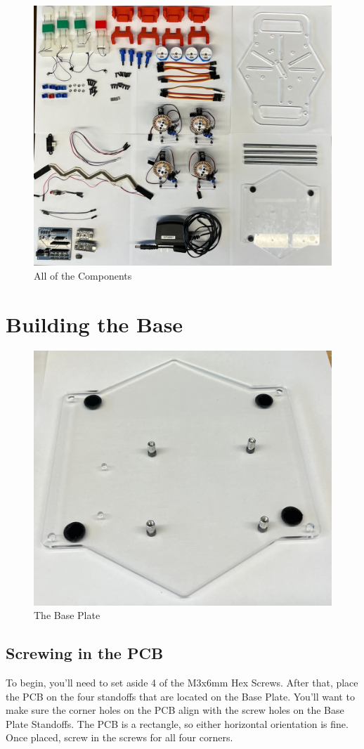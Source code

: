 \documentclass{article}
\begin{document}
\begin{figure}[H]
    \centering
    \includegraphics[scale = .15]{PCBImages/parts_overhead.jpg}
    \caption{All of the Components}
    \label{fig:components_image}
\end{figure}

\section{Building the Base}
\begin{figure}[H]
    \centering
    \includegraphics[width=0.5\linewidth]{PCBImages/Frame/frame_1.png}
    \caption{The Base Plate}
    \label{fig:base_plate}
\end{figure}

\subsection{Screwing in the PCB}
To begin, you'll need to set aside 4 of the M3x6mm Hex Screws. After that, place the PCB on the four standoffs that are located on the Base Plate. You'll want to make sure the corner holes on the PCB align with the screw holes on the Base Plate Standoffs. The PCB is a rectangle, so either horizontal orientation is fine. Once placed, screw in the screws for all four corners.
\end{document}
